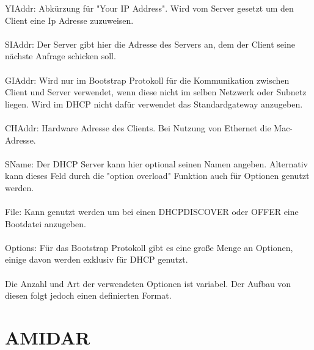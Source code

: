 YIAddr: Abkürzung für "Your IP Address". Wird vom Server gesetzt um den Client eine Ip Adresse zuzuweisen. \\\\
SIAddr: Der Server gibt hier die Adresse des Servers an, dem der Client seine nächste Anfrage schicken soll. \\\\
GIAddr: Wird nur im Bootstrap Protokoll für die Kommunikation zwischen Client und Server verwendet, wenn diese nicht im selben Netzwerk oder Subnetz liegen. Wird im DHCP nicht dafür verwendet das Standardgateway anzugeben. \\\\
CHAddr: Hardware Adresse des Clients. Bei Nutzung von Ethernet die Mac-Adresse. \\\\
SName: Der DHCP Server kann hier optional seinen Namen angeben. Alternativ kann dieses Feld durch die "option overload" Funktion auch für Optionen genutzt werden.\\\\
File: Kann genutzt werden um bei einen DHCPDISCOVER oder OFFER eine Bootdatei anzugeben. \\\\
Options: Für das Bootstrap Protokoll gibt es eine große Menge an Optionen, einige davon werden exklusiv für DHCP genutzt. \\\\
Die Anzahl und Art der verwendeten Optionen ist variabel. Der Aufbau von diesen folgt jedoch einen definierten Format. 


\section{AMIDAR}